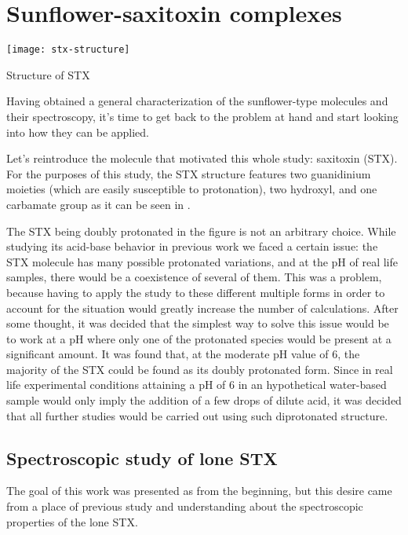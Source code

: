 \chapter{Sunflower-saxitoxin complexes}

\begin{marginfigure}
    \texttt{[image: stx-structure]}
    \caption[Structure of STX]{Structure of STX}
\end{marginfigure}

Having obtained a general characterization of the sunflower-type molecules and their spectroscopy, it's time to get back to the problem at hand and start looking into how they can be applied.

Let's reintroduce the molecule that motivated this whole study: saxitoxin (STX).
For the purposes of this study, the STX structure features two guanidinium moieties (which are easily susceptible to protonation), two hydroxyl, and one carbamate group as it can be seen in .

The STX being doubly protonated in the figure is not an arbitrary choice.
While studying its acid-base behavior in previous work we faced a certain issue: the STX molecule has many possible protonated variations, and at the pH of real life samples, there would be a coexistence of several of them.
This was a problem, because having to apply the study to these different multiple forms in order to account for the situation would greatly increase the number of calculations.
After some thought, it was decided that the simplest way to solve this issue would be to work at a pH where only one of the protonated species would be present at a significant amount.
It was found that, at the moderate pH value of 6, the majority of the STX could be found as its doubly protonated form.
Since in real life experimental conditions attaining a pH of 6 in an hypothetical water-based sample would only imply the addition of a few drops of dilute acid, it was decided that all further studies would be carried out using such diprotonated structure.

\section{Spectroscopic study of lone STX}
The goal of this work was presented as  from the beginning, but this desire came from a place of previous study and understanding about the spectroscopic properties of the lone STX.

